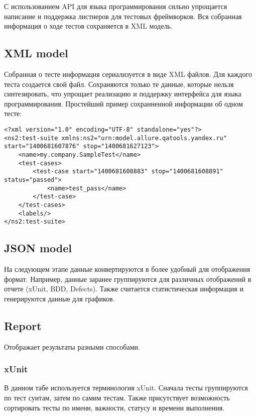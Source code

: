 С использованием API для языка программирования сильно упрощается написание и поддержка листнеров для тестовых фреймворков. Вся собранная информация о ходе тестов сохраняется в XML модель. 

\subsection{XML model}

Собранная о тесте информация сериализуется в виде XML файлов. Для каждого теста создается свой файл. Сохраняются только те данные, которые нельзя синтезировать, что упрощает реализацию и поддержку интерфейса для языка программирования. Простейший пример сохранненной информации об одном тесте:

\begin{lstlisting}[style=XML, caption=Пример простой XML-модели]
<?xml version="1.0" encoding="UTF-8" standalone="yes"?>
<ns2:test-suite xmlns:ns2="urn:model.allure.qatools.yandex.ru" start="1400681607876" stop="1400681627123">
    <name>my.company.SampleTest</name>
    <test-cases>
        <test-case start="1400681608883" stop="1400681608891" status="passed">
            <name>test_pass</name>
        </test-case>
    </test-cases>
    <labels/>
</ns2:test-suite>
\end{lstlisting}

\subsection{JSON model}

На следующем этапе данные конвертируются в более удобный для отображения формат. Например, данные заранее группируются для различных отображений в отчете (xUnit, BDD, Defects). Также считается статистическая информация и генерируются данные для графиков.

\subsection{Report}

Отображает результаты разными способами. 

\subsubsection{xUnit}

В данном табе используется терминология xUnit. Сначала тесты группируются по тест суитам, затем по самим тестам. Также присутствует возможность сортировать тесты по имени, важности, статусу и времени выполнения.

